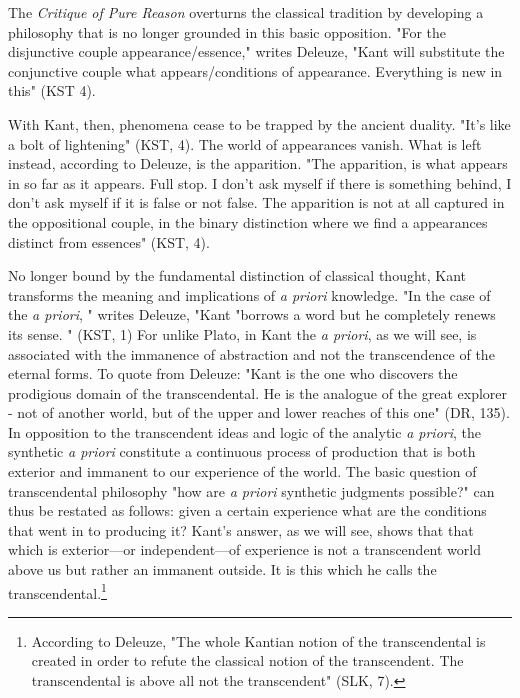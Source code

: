 The \textit{Critique of Pure Reason} overturns the classical tradition by developing a philosophy that is no longer grounded in this basic opposition. "For the disjunctive couple appearance/essence," writes Deleuze, "Kant will substitute the conjunctive couple what appears/conditions of appearance. Everything is new in this" (KST 4).

With Kant, then, phenomena cease to be trapped by the ancient duality. "It's like a bolt of lightening" (KST, 4). The world of appearances vanish. What is left instead, according to Deleuze, is the apparition. "The apparition, is what appears in so far as it appears. Full stop. I don't ask myself if there is something behind, I don't ask myself if it is false or not false. The apparition is not at all captured in the oppositional couple, in the binary distinction where we find a appearances distinct from essences" (KST, 4). 

No longer bound by the fundamental distinction of classical thought, Kant transforms the meaning and implications of \textit{a priori} knowledge. "In the case of the \textit{a priori}, " writes Deleuze, "Kant "borrows a word but he completely renews its sense. " (KST, 1) For unlike Plato, in Kant the \textit{a priori}, as we will see, is associated with the immanence of abstraction and not the transcendence of the eternal forms. To quote from Deleuze: "Kant is the one who discovers the prodigious domain of the transcendental. He is the analogue of the great explorer - not of another world, but of the upper and lower reaches of this one" (DR, 135). In opposition to the transcendent ideas and logic of the analytic \textit{a priori}, the synthetic \textit{a priori} constitute a continuous process of production that is both exterior and immanent to our experience of the world. The basic question of transcendental philosophy "how are \textit{a priori} synthetic judgments possible?" can thus be restated as follows: given a certain experience what are the conditions that went in to producing it? Kant's answer, as we will see, shows that that which is exterior---or independent---of experience is not a transcendent world above us but rather an immanent outside. It is this which he calls the transcendental.\footnote{According to Deleuze, "The whole Kantian notion of the transcendental is created in order to refute the classical notion of the transcendent. The transcendental is above all not the transcendent" (SLK, 7). }

